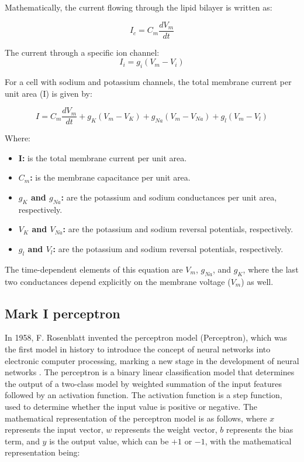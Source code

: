 \documentclass[paper=a4, fontsize=11pt]{scrartcl} %
\numberwithin{equation}{section} %
\numberwithin{figure}{section} %
\numberwithin{table}{section} %
\begin{document}
\vspace{10pt}
Mathematically, the current flowing through the lipid bilayer is written as:

\begin{equation}
    I_{c} = C_{m} \frac{dV_{m}}{dt} 
\end{equation}

The current through a specific ion channel:
\begin{equation}
    I_{i} = g_{i} (V_{m} - V_{i}) 
\end{equation}


For a cell with sodium and potassium channels, the total membrane current per unit area (I) is given by:

\begin{equation}
    I = C_{m} \frac{dV_{m}}{dt} + g_{K} (V_{m} - V_{K}) + g_{Na} (V_{m} - V_{Na}) + g_{l} (V_{m} - V_{l})
\end{equation}


Where:

\begin{itemize}
    \item \textbf{ I:} is the total membrane current per unit area.
    \item \textbf{$C_{m}$:} is the membrane capacitance per unit area.
    \item \textbf{ $g_{K}$ and $g_{Na}$:} are the potassium and sodium conductances per unit area, respectively.
    \item \textbf{$V_{K}$ and $V_{Na}$:} are the potassium and sodium reversal potentials, respectively.
    \item \textbf{$g_{l}$ and $V_{l}$:} are the potassium and sodium reversal potentials, respectively.
\end{itemize}

The time-dependent elements of this equation are \( V_{m} \), \( g_{Na} \), and \( g_{K} \), where the last two conductances depend explicitly on the membrane voltage (\( V_{m} \)) as well.

\subsection{Mark I perceptron}


In 1958, F. Rosenblatt invented the perceptron model (Perceptron), which was the first model in history to introduce the concept of neural networks into electronic computer processing, marking a new stage in the development of neural networks \cite{Rosenblatt1958PerceptronProbabilisticModel}. The perceptron is a binary linear classification model that determines the output of a two-class model by weighted summation of the input features followed by an activation function. The activation function is a step function, used to determine whether the input value is positive or negative. The mathematical representation of the perceptron model is as follows, where \( x \) represents the input vector, \( w \) represents the weight vector, \( b \) represents the bias term, and \( y \) is the output value, which can be \(+1\) or \(-1\), with the mathematical representation being:
\end{document}
